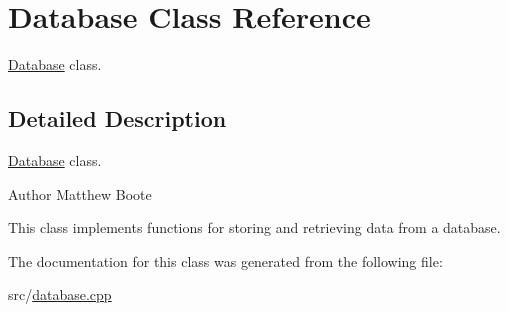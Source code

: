 \hypertarget{classDatabase}{}\section{Database Class Reference}
\label{classDatabase}


\hyperlink{classDatabase}{Database} class.  




\subsection{Detailed Description}
\hyperlink{classDatabase}{Database} class. 

\begin{DoxyAuthor}{Author}
Matthew Boote
\end{DoxyAuthor}
This class implements functions for storing and retrieving data from a database. 

The documentation for this class was generated from the following file\+:\begin{DoxyCompactItemize}
\item 
src/\hyperlink{database_8cpp}{database.\+cpp}\end{DoxyCompactItemize}
